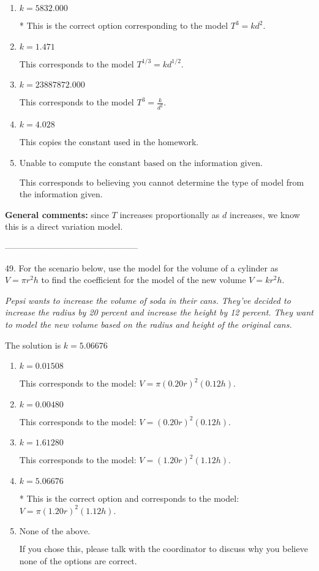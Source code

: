 \documentclass{article}[14pt]
\begin{document}
\begin{enumerate}[label=\Alph*.] 
\item $ k = 5832.000 $ 

 * This is the correct option corresponding to the model $T^{3} = k d^{2}$. 
\item $ k = 1.471 $ 

 This corresponds to the model $T^{1/3} = k d^{1/2}$. 
\item $ k = 23887872.000 $ 

 This corresponds to the model $T^{3} = \frac{k}{d^{2}}$. 
\item $ k = 4.028 $ 

 This copies the constant used in the homework. 
\item $ \text{Unable to compute the constant based on the information given.} $ 

 This corresponds to believing you cannot determine the type of model from the information given. 
\end{enumerate} 
 
\textbf{General comments:} since $T$ increases proportionally as $d$ increases, we know this is a direct variation model.

-----------------------------------------------

49. For the scenario below, use the model for the volume of a cylinder as $V = \pi r^2 h$ to find the coefficient for the model of the new volume $V = k r^2 h$.
\begin{center} \textit{Pepsi wants to increase the volume of soda in their cans. They've decided to increase the radius by 20 percent and increase the height by 12 percent. They want to model the new volume based on the radius and height of the original cans.} \end{center} 
The solution is $ k = 5.06676 $ 

\begin{enumerate}[label=\Alph*.] 
\item $ k = 0.01508 $ 

 This corresponds to the model: $V = \pi (0.20 r)^2 (0.12 h)$. 
\item $ k = 0.00480 $ 

 This corresponds to the model: $V = (0.20 r)^2 (0.12 h)$. 
\item $ k = 1.61280 $ 

 This corresponds to the model: $V = (1.20 r)^2 (1.12 h)$. 
\item $ k = 5.06676 $ 

 * This is the correct option and corresponds to the model: $V = \pi (1.20 r)^2 (1.12 h)$. 
\item $ \text{None of the above.} $ 

 If you chose this, please talk with the coordinator to discuss why you believe none of the options are correct. 
\end{enumerate} 
 
\end{document}
